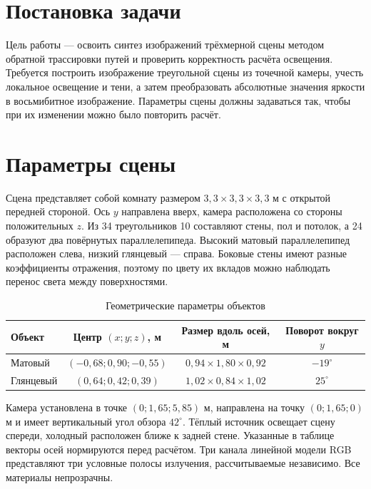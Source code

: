 \section{Постановка задачи}

Цель работы --- освоить синтез изображений трёхмерной сцены методом обратной
трассировки путей и проверить корректность расчёта освещения. Требуется построить
изображение треугольной сцены из точечной камеры, учесть локальное освещение и
тени, а затем преобразовать абсолютные значения яркости в восьмибитное
изображение. Параметры сцены должны задаваться так, чтобы при их изменении
можно было повторить расчёт.

\section{Параметры сцены}

Сцена представляет собой комнату размером \(3{,}3\times3{,}3\times3{,}3\) м с
открытой передней стороной. Ось \(y\) направлена вверх, камера расположена со
стороны положительных \(z\). Из 34 треугольников 10 составляют стены, пол и потолок,
а 24 образуют два повёрнутых параллелепипеда. Высокий матовый параллелепипед
расположен слева, низкий глянцевый --- справа. Боковые стены имеют разные
коэффициенты отражения, поэтому по цвету их вкладов можно наблюдать перенос
света между поверхностями.

\begin{table}[ht]
\centering
\caption{Геометрические параметры объектов}
\begin{tabular}{lccc}
\toprule
Объект & Центр \((x;y;z)\), м & Размер вдоль осей, м & Поворот вокруг \(y\) \\
\midrule
Матовый & \((-0{,}68;0{,}90;-0{,}55)\)
 & \(0{,}94\times1{,}80\times0{,}92\) & \(-19^\circ\) \\
Глянцевый & \((0{,}64;0{,}42;0{,}39)\)
 & \(1{,}02\times0{,}84\times1{,}02\) & \(25^\circ\) \\
\bottomrule
\end{tabular}
\end{table}

Камера установлена в точке \((0;1{,}65;5{,}85)\) м, направлена на точку
\((0;1{,}65;0)\) м и имеет вертикальный угол обзора \(42^\circ\). Тёплый
источник освещает сцену спереди, холодный расположен ближе к задней стене.
Указанные в таблице векторы осей нормируются перед расчётом. Три канала линейной
модели RGB представляют три условные полосы излучения, рассчитываемые
независимо. Все материалы непрозрачны.

